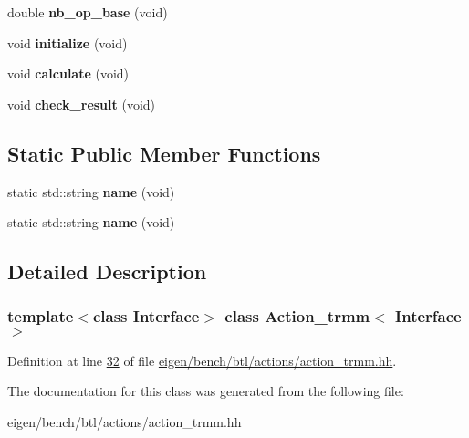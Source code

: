 \begin{DoxyCompactItemize}
double {\bfseries nb\+\_\+op\+\_\+base} (void)
\item 
\mbox{\label{class_action__trmm_ac383abfa1691eb1f99ea3ff8dac0240d}} 
void {\bfseries initialize} (void)
\item 
\mbox{\label{class_action__trmm_aef88530851774b4d1d667e1e14d5fa99}} 
void {\bfseries calculate} (void)
\item 
\mbox{\label{class_action__trmm_afed33724e086f636156f133354b2f94a}} 
void {\bfseries check\+\_\+result} (void)
\end{DoxyCompactItemize}
\subsection*{Static Public Member Functions}
\begin{DoxyCompactItemize}
\item 
\mbox{\label{class_action__trmm_a571f172e625b071e9c27d5f3effd0f4f}} 
static std\+::string {\bfseries name} (void)
\item 
\mbox{\label{class_action__trmm_a571f172e625b071e9c27d5f3effd0f4f}} 
static std\+::string {\bfseries name} (void)
\end{DoxyCompactItemize}


\subsection{Detailed Description}
\subsubsection*{template$<$class Interface$>$\newline
class Action\+\_\+trmm$<$ Interface $>$}



Definition at line \hyperlink{eigen_2bench_2btl_2actions_2action__trmm_8hh_source_l00032}{32} of file \hyperlink{eigen_2bench_2btl_2actions_2action__trmm_8hh_source}{eigen/bench/btl/actions/action\+\_\+trmm.\+hh}.



The documentation for this class was generated from the following file\+:\begin{DoxyCompactItemize}
\item 
eigen/bench/btl/actions/action\+\_\+trmm.\+hh\end{DoxyCompactItemize}

